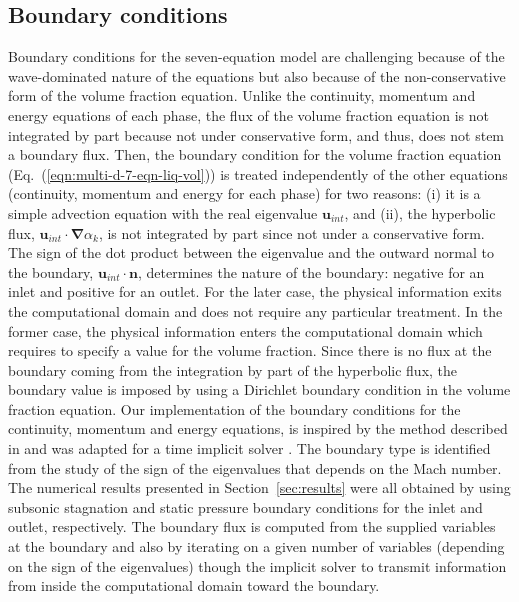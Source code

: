 \documentclass[preprint,10pt]{elsarticle}
\newcommand{\grad}{\mbold{\nabla}}
\newcommand{\mbold}[1]{\boldsymbol#1}
\newcommand{\eqt}[1]{Eq.~(\ref{#1})}                     %
\newcommand{\sct}[1]{Section~\ref{#1}}                   %
\newcommand{\tcr}[1]{\textcolor{red}{#1}}
\newcommand{\tcb}[1]{\textcolor{blue}{#1}}
\begin{document}
\subsection{Boundary conditions} \label{sec:bc}
Boundary conditions for the seven-equation model are challenging because of the wave-dominated nature of the equations but also because of the non-conservative form of the volume fraction equation. Unlike the continuity, momentum and energy equations of each phase, the flux of the volume fraction equation is not integrated by part because not under conservative form, and thus, does not stem a boundary flux. Then, the boundary condition for the volume fraction equation (\eqt{eqn:multi-d-7-eqn-liq-vol}) is treated independently of the other equations (continuity, momentum and energy for each phase) for two reasons: (i) it is a simple advection equation with the real eigenvalue $\mbold u_{int}$, and (ii), the hyperbolic flux, $\mbold u_{int} \cdot \grad \alpha_k$, is not integrated by part since not under a conservative form. The sign of the dot product between the eigenvalue and the outward normal to the boundary, $\mbold u_{int} \cdot \mbold n$, determines the nature of the boundary: negative for an inlet and positive for an outlet. For the later case, the physical information exits the computational domain and does not require any particular treatment. In the former case, the physical information enters the computational domain which requires to specify a value for the volume fraction. Since there is no flux at the boundary coming from the integration by part of the hyperbolic flux, the boundary value is imposed by using a Dirichlet boundary condition in the volume fraction equation.   
Our implementation of the boundary conditions for the continuity, momentum and energy equations, is inspired by the method described in \cite{SEM} and was adapted for a time implicit solver \cite{Marco_dissertation}. The boundary type is identified from the study of the sign of the eigenvalues that depends on the Mach number. The numerical results presented in \sct{sec:results} were all obtained by using subsonic stagnation and static pressure boundary conditions for the inlet and outlet, respectively. The boundary flux is computed from the supplied variables at the boundary and also by iterating on a given number of variables (depending on the sign of the eigenvalues) though the implicit solver to transmit information from inside the computational domain toward the boundary. 
\end{document}
